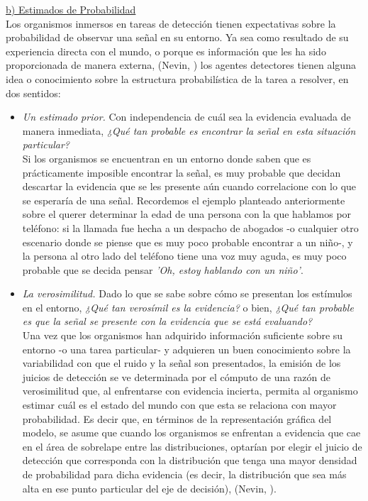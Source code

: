       \underline{b) Estimados de Probabilidad}\\

Los organismos inmersos en tareas de detección tienen expectativas sobre la probabilidad de observar una señal en su entorno. Ya sea como resultado de su experiencia directa con el mundo, o porque es información que les ha sido proporcionada de manera externa, (Nevin, \citeyear{Nevin1969}) los agentes detectores tienen alguna idea o conocimiento sobre la estructura probabilística de la tarea a resolver, en dos sentidos: 

\begin{itemize}
\item \textsl{Un estimado prior.} Con independencia de cuál sea la evidencia evaluada de manera inmediata, \textit{¿Qué tan probable es encontrar la señal en esta situación particular?}\\

Si los organismos se encuentran en un entorno donde saben que es prácticamente imposible encontrar la señal, es muy probable que decidan descartar la evidencia que se les presente aún cuando correlacione con lo que se esperaría de una señal. Recordemos el ejemplo planteado anteriormente sobre el querer determinar la edad de una persona con la que hablamos por teléfono: si la llamada fue hecha a un despacho de abogados -o cualquier otro escenario donde se piense que es muy poco probable encontrar a un niño-, y la persona al otro lado del teléfono tiene una voz muy aguda, es muy poco probable que se decida pensar \textit{'Oh, estoy hablando con un niño'}.\\

\item \textsl{La verosimilitud.} Dado lo que se sabe sobre cómo se presentan los estímulos en el entorno, \textit{¿Qué tan verosímil es la evidencia?} o bien, \textit{¿Qué tan probable es que la señal se presente con la evidencia que se está evaluando?}\\

Una vez que los organismos han adquirido información suficiente sobre su entorno -o una tarea particular- y adquieren un buen conocimiento sobre la variabilidad con que el ruido y la señal son presentados, la emisión de los juicios de detección se ve determinada por el cómputo de una razón de verosimilitud que, al enfrentarse con evidencia incierta, permita al organismo estimar cuál es el estado del mundo con que esta se relaciona con mayor probabilidad. Es decir que, en términos de la representación gráfica del modelo, se asume que cuando los organismos se enfrentan a evidencia que cae en el área de sobrelape entre las distribuciones, optarían por elegir el juicio de detección que corresponda con la distribución que tenga una mayor densidad de probabilidad para dicha evidencia (es decir, la distribución que sea más alta en ese punto particular del eje de decisión), (Nevin, \citeyear{Nevin1969}).\\
\end{itemize}

